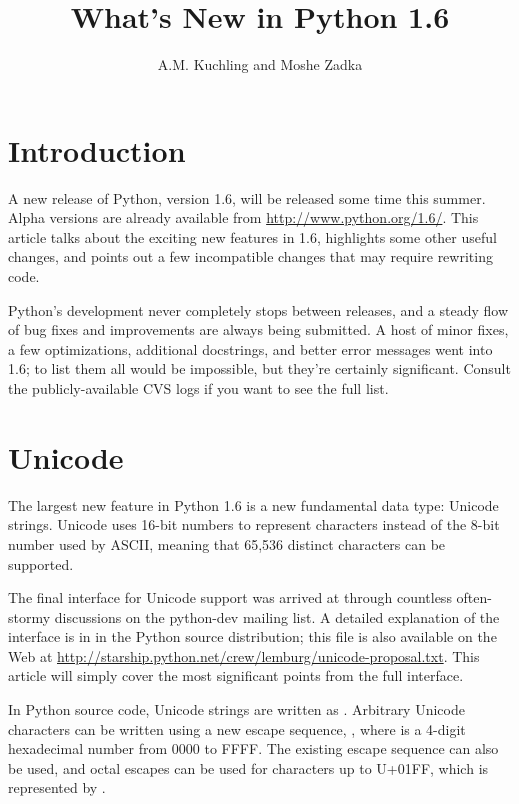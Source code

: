 \documentclass{howto}
\title{What's New in Python 1.6}
\author{A.M. Kuchling and Moshe Zadka}
\begin{document}
\maketitle\tableofcontents

\section{Introduction}

A new release of Python, version 1.6, will be released some time this
summer.  Alpha versions are already available from
\url{http://www.python.org/1.6/}.  This article talks about the
exciting new features in 1.6, highlights some other useful changes,
and points out a few incompatible changes that may require rewriting
code.

Python's development never completely stops between releases, and a
steady flow of bug fixes and improvements are always being submitted.
A host of minor fixes, a few optimizations, additional docstrings, and
better error messages went into 1.6; to list them all would be
impossible, but they're certainly significant.  Consult the
publicly-available CVS logs if you want to see the full list.

\section{Unicode}

The largest new feature in Python 1.6 is a new fundamental data type:
Unicode strings.  Unicode uses 16-bit numbers to represent characters
instead of the 8-bit number used by ASCII, meaning that 65,536
distinct characters can be supported.

The final interface for Unicode support was arrived at through
countless often-stormy discussions on the python-dev mailing list.  A
detailed explanation of the interface is in  in
the Python source distribution; this file is also available on the Web
at \url{http://starship.python.net/crew/lemburg/unicode-proposal.txt}.
This article will simply cover the most significant points from the
full interface.

In Python source code, Unicode strings are written as
.  Arbitrary Unicode characters can be written using a
new escape sequence, , where  is a
4-digit hexadecimal number from 0000 to FFFF.  The existing
 escape sequence can also be used, and octal
escapes can be used for characters up to U+01FF, which is represented
by .
\end{document}
